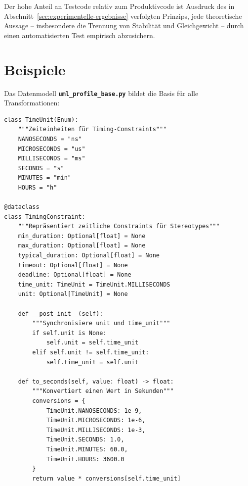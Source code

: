 ﻿\documentclass[a4paper,12pt]{report}
\theoremstyle{definition}
\begin{document}
Der hohe Anteil an Testcode relativ zum Produktivcode ist Ausdruck des in Abschnitt~\ref{sec:experimentelle-ergebnisse} verfolgten Prinzips, jede theoretische Aussage -- insbesondere die Trennung von Stabilität und Gleichgewicht -- durch einen automatisierten Test empirisch abzusichern.

\section{Beispiele}

Das Datenmodell \texttt{\textbf{uml\_profile\_base.py}} bildet die Basis für alle Transformationen:
\begin{lstlisting}[style=python, caption={TimingConstraint Klasse}, label={lst:timing-constraint}]
class TimeUnit(Enum):
    """Zeiteinheiten für Timing-Constraints"""
    NANOSECONDS = "ns"
    MICROSECONDS = "us"
    MILLISECONDS = "ms"
    SECONDS = "s"
    MINUTES = "min"
    HOURS = "h"

@dataclass
class TimingConstraint:
    """Repräsentiert zeitliche Constraints für Stereotypes"""
    min_duration: Optional[float] = None 
    max_duration: Optional[float] = None 
    typical_duration: Optional[float] = None 
    timeout: Optional[float] = None 
    deadline: Optional[float] = None 
    time_unit: TimeUnit = TimeUnit.MILLISECONDS
    unit: Optional[TimeUnit] = None 
    
    def __post_init__(self):
        """Synchronisiere unit und time_unit"""
        if self.unit is None:
            self.unit = self.time_unit
        elif self.unit != self.time_unit:
            self.time_unit = self.unit
    
    def to_seconds(self, value: float) -> float:
        """Konvertiert einen Wert in Sekunden"""
        conversions = {
            TimeUnit.NANOSECONDS: 1e-9,
            TimeUnit.MICROSECONDS: 1e-6,
            TimeUnit.MILLISECONDS: 1e-3,
            TimeUnit.SECONDS: 1.0,
            TimeUnit.MINUTES: 60.0,
            TimeUnit.HOURS: 3600.0
        }
        return value * conversions[self.time_unit]
\end{lstlisting}
\end{document}

